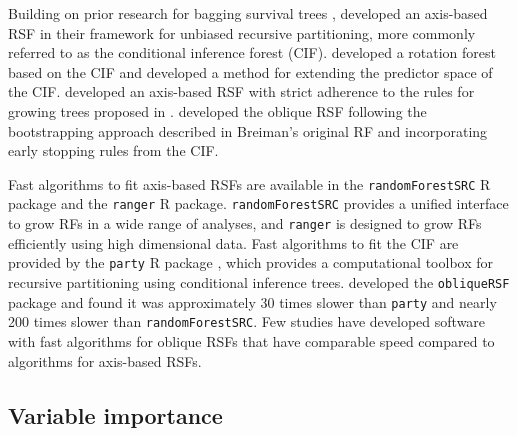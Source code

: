 \documentclass{article}\usepackage[]{graphicx}\usepackage[]{xcolor}
\begin{document}
Building on prior research for bagging survival trees \citep{hothorn2004bagging}, \citet{hothorn2006unbiased} developed an axis-based RSF in their framework for unbiased recursive partitioning, more commonly referred to as the conditional inference forest (CIF). \citet{zhou2016random} developed a rotation forest based on the CIF and \citet{wang2017random} developed a method for extending the predictor space of the CIF. \citet{ishwaran2008random} developed an axis-based RSF with strict adherence to the rules for growing trees proposed in \citet{breiman2001random}.  \citet{jaeger2019oblique} developed the oblique RSF following the bootstrapping approach described in Breiman's original RF and incorporating early stopping rules from the CIF.

Fast algorithms to fit axis-based RSFs are available in the \texttt{randomForestSRC} R package \citep{randomForestSRC} and the \texttt{ranger} \citep{ranger} R package. \texttt{randomForestSRC} provides a unified interface to grow RFs in a wide range of analyses, and \texttt{ranger} is designed to grow RFs efficiently using high dimensional data. Fast algorithms to fit the CIF are provided by the \texttt{party} R package \citep{hothorn2010party}, which provides a computational toolbox for recursive partitioning using conditional inference trees. \citet{jaeger2019oblique} developed the \texttt{obliqueRSF} package and found it was approximately 30 times slower than \texttt{party} and nearly 200 times slower than \texttt{randomForestSRC}. Few studies have developed software with fast algorithms for oblique RSFs that have comparable speed compared to algorithms for axis-based RSFs.

\subsection{Variable importance} \label{sec:rw_vi}
\end{document}
